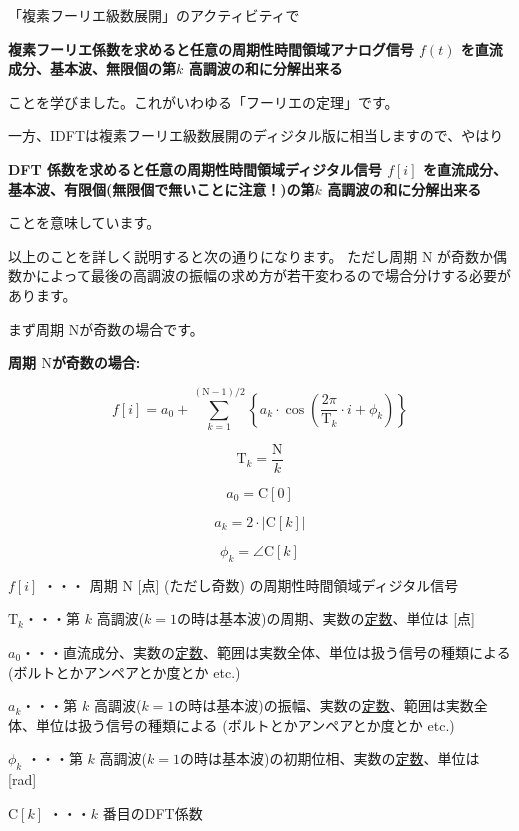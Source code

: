\documentclass[a4paper]{jarticle}
\begin{document}

\bigskip
「複素フーリエ級数展開」のアクティビティで

\medskip
\noindent\textbf{複素フーリエ係数を求めると任意の周期性時間領域アナログ信号 $f(t)$ を直流成分、基本波、無限個の第$k$ 高調波の和に分解出来る}

\medskip
\noindent ことを学びました。これがいわゆる「フーリエの定理」です。

\medskip
一方、IDFTは複素フーリエ級数展開のディジタル版に相当しますので、やはり

\medskip
\noindent\textbf{DFT 係数を求めると任意の周期性時間領域ディジタル信号 $f[i]$ を直流成分、基本波、有限個(無限個で無いことに注意！)の第$k$ 高調波の和に分解出来る}

\medskip
\noindent ことを意味しています。

\medskip
以上のことを詳しく説明すると次の通りになります。
ただし周期 $\textrm{N}$ が奇数か偶数かによって最後の高調波の振幅の求め方が若干変わるので場合分けする必要があります。

\medskip
まず周期 $\textrm{N}$が奇数の場合です。

\begin{framed}
\noindent\quad \textbf{周期 $\textrm{N}$が奇数の場合:}

\[
f[i] = a_0 + \sum_{k=1}^{(\textrm{N}-1)/2}
\left \{
a_k \cdot \cos \left ( \frac{2\pi}{\textrm{T}_k} \cdot i + \phi_k \right )
\right \}
\]

\[
\textrm{T}_k = \frac{\textrm{N}}{k}
\]

\[
a_0 = \textrm{C}[0]
\]

\[
a_k = 2 \cdot |\textrm{C}[k]|
\]

\[
\phi_k = \angle \textrm{C}[k]
\]

\bigskip
\noindent\quad $f[i]$ ・・・ 周期 $\textrm{N}$ [点] (ただし奇数) の周期性時間領域ディジタル信号

\bigskip
\noindent\quad $\textrm{T}_k$・・・第 $k$ 高調波($k=1$の時は基本波)の周期、実数の\underline{定数}、単位は [点]

\bigskip
\noindent\quad $a_0$・・・直流成分、実数の\underline{定数}、範囲は実数全体、単位は扱う信号の種類による (ボルトとかアンペアとか度とか etc.)

\bigskip
\noindent\quad $a_k$・・・第 $k$ 高調波($k=1$の時は基本波)の振幅、実数の\underline{定数}、範囲は実数全体、単位は扱う信号の種類による (ボルトとかアンペアとか度とか etc.)

\bigskip
\noindent\quad $\phi_k$ ・・・第 $k$ 高調波($k=1$の時は基本波)の初期位相、実数の\underline{定数}、単位は [rad]

\bigskip
\noindent\quad $\textrm{C}[k]$ ・・・$k$ 番目のDFT係数
\end{framed}
\end{document}
